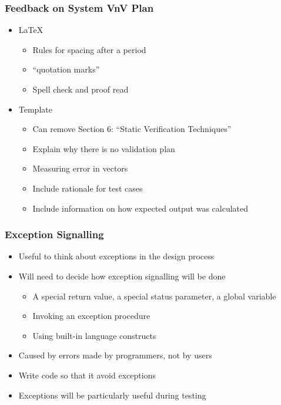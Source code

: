 \documentclass[t,12pt,numbers,fleqn,handout]{beamer}
\begin{document}
\begin{frame}

\frametitle{Feedback on System VnV Plan}

\begin{itemize}
\item \LaTeX{}
\begin{itemize}
\item Rules for spacing after a period
\item ``quotation marks''
\item Spell check and proof read
\end{itemize}
\item Template
\begin{itemize}
\item Can remove Section 6: ``Static Verification Techniques''
\item Explain why there is no validation plan
\item Measuring error in vectors
\item Include rationale for test cases
\item Include information on how expected output was calculated
\end{itemize}
\end{itemize}

\end{frame}


\begin{frame}

\frametitle{Exception Signalling}

\begin{itemize}
\item Useful to think about exceptions in the design process
\item Will need to decide how exception signalling will be done
\begin{itemize}
\item A special return value, a special status parameter, a global variable
\item Invoking an exception procedure
\item Using built-in language constructs
\end{itemize}
\item Caused by errors made by programmers, not by users
\item Write code so that it avoid exceptions
\item Exceptions will be particularly useful during testing
\end{itemize}

\end{frame}
\end{document}
